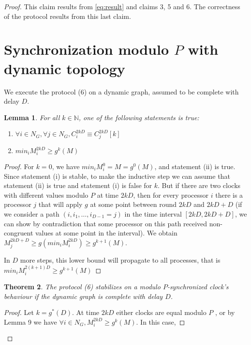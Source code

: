 \documentclass[11pt,letterpaper]{article}
\newtheorem{thm}{Theorem}
\newtheorem{lem}[thm]{Lemma}
\begin{document}
\begin{proof}
	This claim results from \eqref{eq:result} and claims 3, 5 and 6.
	The correctness of the protocol results from this last claim.


\section{Synchronization modulo $P$ with dynamic topology}

We execute the protocol (6) on a dynamic graph, assumed to be complete with delay $D$.

\begin{lem}
	For all $k \in \mathds{N}$, one of the following statements is true:
	\begin{enumerate}
		\item $\forall i \in N_G, \forall j \in N_G, C_i^{2kD} \equiv C_j^{2kD} [k]$
		\item $min_i M_i^{2kD} \geq g^k(M)$
	\end{enumerate}
\end{lem}
\begin{proof}
	For $k=0$, we have $min_i M_i^0 = M = g^0(M)$, and
	statement (ii) is true. Since statement (i) is stable, to make
	the inductive step we can assume that statement (ii) is true
	and statement (i) is false for $k$.
	But if there are two clocks
	with different values modulo $P$ at time $2kD$, then for every
	processor $i$ there is a processor $j$ that
	will apply $g$ at some point between round $2kD$ and $2kD+D$
	(if we consider a path $(i, i_1, \dots, i_{D-1} = j)$ in the time interval $[2kD, 2kD+D]$,
	we can show by contradiction that some processor on this path received non-congruent values
	at some point in the interval).
	We obtain
	$M_j^{2kD+D} \geq g(min_i M_i^{2kD}) \geq g^{k+1}(M)$.

	In $D$ more steps, this lower bound will propagate to all processes, that is
	$min_i M_i^{2(k+1)D} \geq g^{k+1}(M)$
\end{proof}

\begin{thm}
	The protocol (6) stabilizes on a modulo $P$-synchronized clock's behaviour if the dynamic graph is complete with delay $D$.
\end{thm}
\begin{proof}
	Let $k = g^*(D)$.
	At time $2kD$ either clocks are equal
	modulo $P$ , or by Lemma 9 we have $\forall i \in N_G, M_i^{2kD} \geq g^k(M)$.
	In this case,


\end{proof}
\end{proof}
\end{document}
